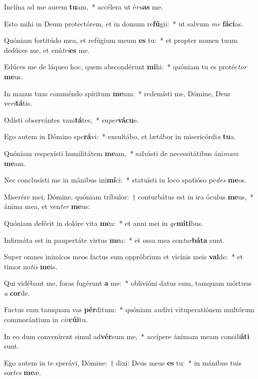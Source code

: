 \item Inclína ad me aurem \textbf{tu}am,~* accélera ut é\textit{ru}\textbf{as} me.
\item Esto mihi in Deum protectórem, et in domum re\textbf{fú}gii:~* ut salvum \textit{me} \textbf{fá}\textbf{ci}as.
\item Quóniam fortitúdo mea, et refúgium meum \textbf{es} tu:~* et propter nomen tuum dedúces me, et enú\textit{tri}\textbf{es} me.
\item Edúces me de láqueo hoc, quem abscondérunt \textbf{mi}hi:~* quóniam tu es protéc\textit{tor} \textbf{me}us.
\item In manus tuas comméndo spíritum \textbf{me}um:~* redemísti me, Dómine, Deus ve\textit{ri}\textbf{tá}tis.
\item Odísti observántes vani\textbf{tá}tes,~* su\textit{per}\textbf{vá}\textbf{cu}e.
\item Ego autem in Dómino spe\textbf{rá}vi:~* exsultábo, et lætábor in misericórdi\textit{a} \textbf{tu}a.
\item Quóniam respexísti humilitátem \textbf{me}am,~* salvásti de necessitátibus áni\textit{mam} \textbf{me}am.
\item Nec conclusísti me in mánibus ini\textbf{mí}ci:~* statuísti in loco spatióso pe\textit{des} \textbf{me}os.
\item Miserére mei, Dómine, quóniam tríbulor:~† conturbátus est in ira óculus \textbf{me}us,~* ánima mea, et ven\textit{ter} \textbf{me}us:
\item Quóniam defécit in dolóre vita \textbf{me}a:~* et anni mei in \textit{ge}\textbf{mí}\textbf{ti}bus.
\item Infirmáta est in paupertáte virtus \textbf{me}a:~* et ossa mea con\textit{tur}\textbf{bá}\textbf{ta} sunt.
\item Super omnes inimícos meos factus sum oppróbrium et vicínis meis \textbf{val}de:~* et timor no\textit{tis} \textbf{me}is.
\item Qui vidébant me, foras fugérunt \textbf{a} me:~* oblivióni datus sum, tamquam mórtuus \textit{a} \textbf{cor}de.
\item Factus sum tamquam vas \textbf{pér}ditum:~* quóniam audívi vituperatiónem multórum commorántium in \textit{cir}\textbf{cú}\textbf{i}tu.
\item In eo dum convenírent simul ad\textbf{vér}sum me,~* accípere ánimam meam consi\textit{li}\textbf{á}\textbf{ti} sunt.
\item Ego autem in te sperávi, Dómine:~† dixi: Deus meus \textbf{es} tu:~* in mánibus tuis sor\textit{tes} \textbf{me}æ.
